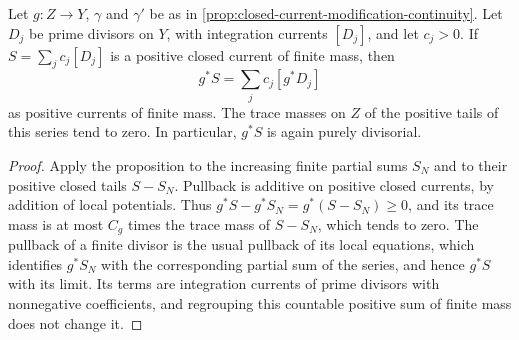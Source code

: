 \begin{corollary}\label{cor:countable-divisorial-pullback}
Let $g\colon Z\to Y$, $\gamma$ and $\gamma'$ be as in \cref{prop:closed-current-modification-continuity}. Let $D_j$ be prime divisors on $Y$, with integration currents $[D_j]$, and let $c_j>0$. If $S=\sum_j c_j[D_j]$ is a positive closed current of finite mass, then
\[
 g^*S=\sum_j c_j[g^*D_j]
\]
as positive currents of finite mass. The trace masses on $Z$ of the positive tails of this series tend to zero. In particular, $g^*S$ is again purely divisorial.
\end{corollary}
\begin{proof}
Apply the proposition to the increasing finite partial sums $S_N$ and to their positive closed tails $S-S_N$. Pullback is additive on positive closed currents, by addition of local potentials. Thus $g^*S-g^*S_N=g^*(S-S_N)\geq0$, and its trace mass is at most $C_g$ times the trace mass of $S-S_N$, which tends to zero. The pullback of a finite divisor is the usual pullback of its local equations, which identifies $g^*S_N$ with the corresponding partial sum of the series, and hence $g^*S$ with its limit. Its terms are integration currents of prime divisors with nonnegative coefficients, and regrouping this countable positive sum of finite mass does not change it.
\end{proof}
